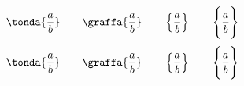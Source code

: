 
\[\tonda{\dfrac{a}{b}} \qquad \graffa{\dfrac{a}{b}} \qquad 
\left\{\dfrac{a}{b}\right\} \qquad \Biggl\{\dfrac{a}{b}\Biggr\}\]
$$\tonda{\dfrac{a}{b}} \qquad \graffa{\dfrac{a}{b}} \qquad 
\left\{\dfrac{a}{b}\right\} \qquad \Biggl\{\dfrac{a}{b}\Biggr\}$$

